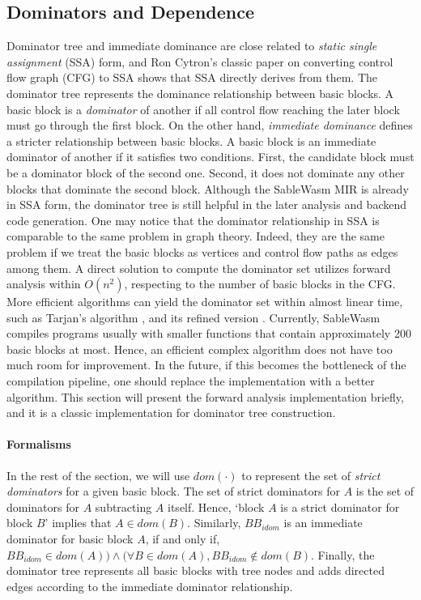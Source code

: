 \subsection{Dominators and Dependence}
\label{section:mir-opt-dominator}

Dominator tree and immediate dominance are close related to \emph{static single
    assignment} (SSA) form, and Ron Cytron's classic paper on converting
control flow graph (CFG) to SSA \cite{ibm-ssa} shows that SSA directly derives
from them. The dominator tree represents the dominance relationship between
basic blocks. A basic block is a \emph{dominator} of another if all control flow
reaching the later block must go through the first block. On the other hand,
\emph{immediate dominance} defines a stricter relationship between basic blocks.
A basic block is an immediate dominator of another if it satisfies two
conditions. First, the candidate block must be a dominator block of the second
one. Second, it does not dominate any other blocks that dominate the second
block. Although the SableWasm MIR is already in SSA form, the dominator tree is
still helpful in the later analysis and backend code generation. One may notice
that the dominator relationship in SSA is comparable to the same problem in
graph theory. Indeed, they are the same problem if we treat the basic blocks as
vertices and control flow paths as edges among them.  A direct solution to
compute the dominator set utilizes forward analysis within $O(n^2)$, respecting
to the number of basic blocks in the CFG. More efficient algorithms can yield
the dominator set within almost linear time, such as Tarjan's algorithm
\cite{tarjan-fast-dominator}, and its refined version
\cite{tarjan-fast-dominator-improved}. Currently, SableWasm compiles programs
usually with smaller functions that contain approximately 200 basic blocks at
most. Hence, an efficient complex algorithm does not have too much room for
improvement. In the future, if this becomes the bottleneck of the compilation
pipeline, one should replace the implementation with a better algorithm. This
section will present the forward analysis implementation briefly, and it is a
classic implementation for dominator tree construction.

\paragraph{Formalisms}
In the rest of the section, we will use $dom(\cdot)$ to represent the set of
\emph{strict dominators} for a given basic block. The set of strict dominators
for $A$ is the set of dominators for $A$ subtracting $A$ itself. Hence, `block
$A$ is a strict dominator for block $B$' implies that $A \in dom(B)$. Similarly,
$BB_{idom}$ is an immediate dominator for basic block $A$, if and only if,
$BB_{idom} \in dom(A)) \land (\forall B \in dom(A), BB_{idom} \notin dom(B)$.
Finally, the dominator tree represents all basic blocks with tree nodes and adds
directed edges according to the immediate dominator relationship.

